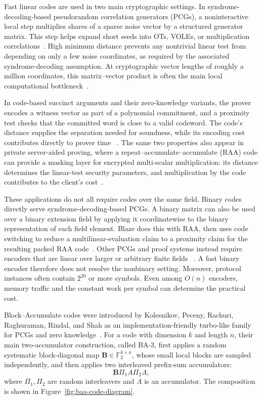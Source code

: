 \documentclass[runningheads,envcountsame,envcountsect]{llncs}
\newcommand{\F}{\mathbb F}
\begin{document}
Fast linear codes are used in two main cryptographic settings.  In
syndrome-decoding-based pseudorandom correlation generators (PCGs), a
noninteractive local step multiplies shares of a sparse noise vector by a
structured generator matrix.  This step helps expand short seeds into OTs,
VOLEs, or multiplication correlations~\cite{bcgi18,bcg19pcg}.  High minimum
distance prevents any nontrivial linear test from depending on only a few noise
coordinates, as required by the associated syndrome-decoding assumption.  At
cryptographic vector lengths of roughly a million coordinates, this
matrix--vector product is often the main local computational
bottleneck~\cite{baa26}.

In code-based succinct arguments and their zero-knowledge variants, the prover
encodes a witness vector as part of a polynomial commitment, and a
proximity test checks that the committed word is close to a valid codeword.
The code's distance supplies the separation needed for soundness, while its
encoding cost contributes directly to prover time
~\cite{orion22,brakedown23,blaze25,era26,blindraa26}.  The same two properties
also appear in private server-aided proving, where a
repeat--accumulate--accumulate (RAA) code can provide a masking layer for
encrypted multi-scalar multiplication: its distance determines the linear-test
security parameters, and multiplication by the code contributes to the
client's cost~\cite{outsourcing26}.

These applications do not all require codes over the same field.  Binary codes
directly serve syndrome-decoding-based PCGs.  A binary matrix can also be used
over a binary extension field by applying it coordinatewise to the binary
representation of each field element.  Blaze does this with RAA, then uses code
switching to reduce a multilinear-evaluation claim to a proximity claim for the
resulting packed RAA code~\cite{blaze25}.
Other PCGs and proof systems instead require encoders that are linear over
larger or arbitrary finite fields
~\cite{lxyy25,brakedown23,fieldEA24,outsourcing26,era26,blindraa26}.  A fast
binary encoder therefore does not resolve the nonbinary setting.  Moreover,
protocol instances often contain $2^{20}$ or more symbols.  Even among $O(n)$
encoders, memory traffic and the constant work per symbol can determine the
practical cost.

Block--Accumulate codes were introduced by Kolesnikov, Peceny, Rachuri,
Raghuraman, Rindal, and Shah as an implementation-friendly turbo-like family for
PCGs and zero knowledge~\cite{baa26}.  For a code with dimension $k$ and length
$n$, their main two-accumulator construction, called BA-3, first
applies a random systematic block-diagonal map
$\mathbf B\in\F_2^{k\times n}$, whose small local blocks
are sampled independently, and then applies two interleaved prefix-sum
accumulators:
\[
    \mathbf B\Pi_1A\Pi_2A,
\]
where $\Pi_1,\Pi_2$ are random interleavers and $A$ is an accumulator.  The
composition is shown in Figure~\ref{fig:baa-code-diagram}.
\end{document}
